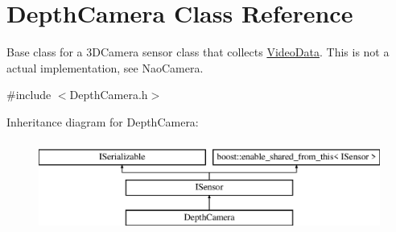 \hypertarget{class_depth_camera}{}\section{Depth\+Camera Class Reference}
\label{class_depth_camera}


Base class for a 3\+D\+Camera sensor class that collects \hyperlink{class_video_data}{Video\+Data}. This is not a actual implementation, see Nao\+Camera.  




{\ttfamily \#include $<$Depth\+Camera.\+h$>$}

Inheritance diagram for Depth\+Camera\+:\begin{figure}[H]
\begin{center}
\leavevmode
\includegraphics[height=3.000000cm]{class_depth_camera}
\end{center}
\end{figure}
